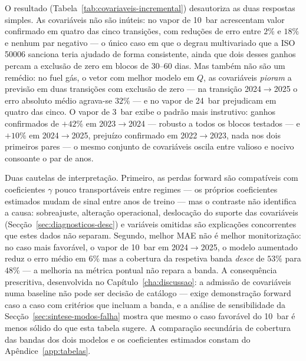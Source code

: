 O resultado (Tabela~\ref{tab:covariaveis-incremental}) desautoriza as duas respostas
simples. As covariáveis não são inúteis: no vapor de 10~bar acrescentam valor
confirmado em quatro das cinco transições, com reduções de erro entre $2\%$ e
$18\%$ e nenhum par negativo --- o único caso em que o degrau multivariado
que a ISO 50006 sanciona teria ajudado de forma consistente, ainda que dois
desses ganhos percam a exclusão de zero em blocos de 30--60 dias. Mas também
não são um remédio: no fuel gás, o vetor com melhor modelo em $Q$, as
covariáveis \emph{pioram} a previsão em duas transições com exclusão de zero
--- na transição 2024${\to}$2025 o erro absoluto médio agrava-se $32\%$ --- e
no vapor de 24~bar prejudicam em quatro das cinco. O vapor de 3~bar exibe o
padrão mais instrutivo: ganhos confirmados de $+42\%$ em 2023${\to}$2024 ---
robusto a todos os blocos testados --- e $+10\%$ em 2024${\to}$2025, prejuízo
confirmado em 2022${\to}$2023, nada nos dois primeiros pares --- o mesmo
conjunto de covariáveis oscila entre valioso e nocivo consoante o par de
anos.

Duas cautelas de interpretação. Primeiro, as perdas forward são compatíveis
com coeficientes $\gamma$ pouco transportáveis entre regimes --- os próprios
coeficientes estimados mudam de sinal entre anos de treino --- mas o contraste
não identifica a causa: sobreajuste, alteração operacional, deslocação do
suporte das covariáveis (Secção~\ref{sec:diagnosticos-desc}) e variáveis
omitidas são explicações concorrentes que estes dados não separam.
 Segundo,
melhor MAE não é melhor monitorização: no caso mais favorável, o vapor de
10~bar em 2024${\to}$2025, o modelo aumentado reduz o erro médio em $6\%$ mas
a cobertura da respetiva banda \emph{desce} de $53\%$ para $48\%$ --- a
melhoria na métrica pontual não repara a banda. A consequência prescritiva,
desenvolvida no Capítulo~\ref{cha:discussao}: a admissão de covariáveis numa
baseline não pode ser decisão de catálogo --- exige demonstração forward caso
a caso com critérios que incluam a banda, e a análise de sensibilidade da
Secção~\ref{sec:sintese-modos-falha} mostra que mesmo o caso favorável do
10~bar é menos sólido do que esta tabela sugere. A comparação secundária de
cobertura das bandas dos dois modelos e os coeficientes estimados constam do
Apêndice~\ref{app:tabelas}.



